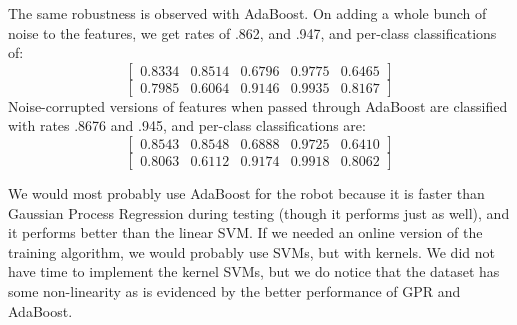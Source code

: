 \documentclass[letterpaper]{article}
\begin{document}
The same robustness is observed with AdaBoost. On adding a whole bunch of noise to the features, we get rates of .862, and .947, and per-class classifications of:
$$\begin{bmatrix} 0.8334 &   0.8514 &   0.6796  & 0.9775  &  0.6465\end{bmatrix}$$
$$\begin{bmatrix} 0.7985 &   0.6064   & 0.9146 &   0.9935 &   0.8167\end{bmatrix}$$
Noise-corrupted versions of features when passed through AdaBoost are classified with rates .8676 and .945, and per-class classifications are:
$$\begin{bmatrix} 0.8543 &   0.8548 &   0.6888&    0.9725  &  0.6410\end{bmatrix}$$
$$\begin{bmatrix} 0.8063  &  0.6112 &   0.9174  &  0.9918  &  0.8062\end{bmatrix}$$

We would most probably use AdaBoost for the robot because it is faster than Gaussian Process Regression during testing (though it performs just as well), and it performs better than the linear SVM. If we needed an online version of the training algorithm, we would probably use SVMs, but with kernels. We did not have time to implement the kernel SVMs, but we do notice that the dataset has some non-linearity as is evidenced by the better performance of GPR and AdaBoost.
\end{document}
